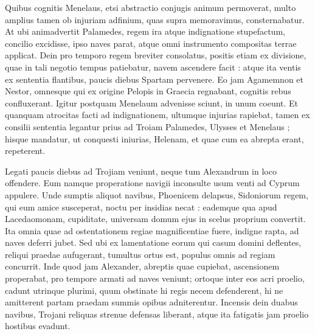 \documentclass{article}
\begin{document}
\begin{pages}
\begin{Rightside}
Quibus cognitis Menelaus, etsi abstractio conjugis animum permoverat, multo amplius tamen ob injuriam adfinium, quas supra memoravimus, consternabatur. At ubi animadvertit Palamedes, regem ira atque indignatione stupefactum, concilio excidisse, ipso naves parat, atque omni instrumento compositas terrae applicat. Dein pro temporo regem breviter consolatus, positis etiam ex divisione, quae in tali negotio tempus patiebatur, navem ascendere facit : atque ita ventis ex sententia flantibus, paucis diebus Spartam pervenere. Eo jam Agamemnon et Nestor, omnesque qui ex origine Pelopis in Graecia regnabant, cognitis rebus confluxerant. Igitur postquam Menelaum advenisse sciunt, in unum coeunt. Et quanquam atrocitas facti ad indignationem, ultumque injurias rapiebat, tamen ex consilii sententia legantur prius ad Troiam Palamedes, Ulysses et Menelaus ; hisque mandatur, ut conquesti iniurias, Helenam, et quae cum ea abrepta erant, repeterent.

Legati paucis diebus ad Trojiam veniunt, neque tum Alexandrum in loco offendere. Eum namque properatione navigii inconsulte usum venti ad Cyprum appulere. Unde sumptis aliquot navibus, Phoenicem delapsus, Sidoniorum regem, qui eum amice susceperat, noctu per insidias necat : eademque qua apud Lacedaomonam, cupiditate, universam domum ejus in scelus proprium convertit. Ita omnia quae ad ostentationem regiae magnificentiae fuere, indigne rapta, ad naves deferri jubet. Sed ubi ex lamentatione eorum qui casum domini deflentes, reliqui praedae aufugerant, tumultus ortus est, populus omnis ad regiam concurrit. Inde quod jam Alexander, abreptis quae cupiebat, ascensionem properabat, pro tempore armati ad naves veniunt; ortoque inter eos acri proelio, cadunt utrinque plurimi, quum obstinate hi regis necem defenderent, hi ne amitterent partam praedam summis opibus adniterentur. Incensis dein duabus navibus, Trojani reliquas strenue defensas liberant, atque ita fatigatis jam proelio hostibus evadunt.

\endnumbering
\end{Rightside}

\end{pages}
\Pages
\end{document}
